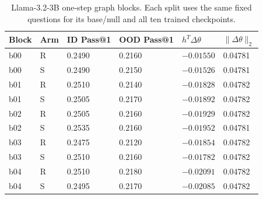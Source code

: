 \begin{table}[H]
\caption{Llama-3.2-3B one-step graph blocks. Each split uses the same fixed questions for its base/null and all ten trained checkpoints.}
\label{tab:one-step-blocks-graph_unaudited_llama3.2-3b}
\centering\small\setlength{\tabcolsep}{3pt}
\begin{tabular}{@{}llllll@{}}
\toprule
Block & Arm & ID Pass@1 & OOD Pass@1 & $h^T\Delta\theta$ & $\|\Delta\theta\|_2$\\
\midrule
b00 & R & 0.2490 & 0.2160 & $-0.01550$ & 0.04781\\
b00 & S & 0.2490 & 0.2150 & $-0.01526$ & 0.04781\\
b01 & R & 0.2510 & 0.2140 & $-0.01828$ & 0.04782\\
b01 & S & 0.2505 & 0.2170 & $-0.01892$ & 0.04782\\
b02 & R & 0.2505 & 0.2160 & $-0.01929$ & 0.04782\\
b02 & S & 0.2535 & 0.2160 & $-0.01952$ & 0.04781\\
b03 & R & 0.2475 & 0.2120 & $-0.01854$ & 0.04782\\
b03 & S & 0.2510 & 0.2160 & $-0.01782$ & 0.04782\\
b04 & R & 0.2510 & 0.2180 & $-0.02091$ & 0.04782\\
b04 & S & 0.2495 & 0.2170 & $-0.02085$ & 0.04782\\
\bottomrule
\end{tabular}
\end{table}
